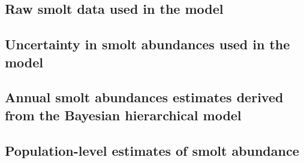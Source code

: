 \documentclass[12pt]{article}
\begin{document}
\clearpage



\clearpage



\clearpage



\clearpage

\subsection*{Raw smolt data used in the model}



\clearpage

\subsection*{Uncertainty in smolt abundances used in the model}



\clearpage

\subsection*{Annual smolt abundances estimates derived from the Bayesian hierarchical model}


\clearpage

\subsection*{Population-level estimates of smolt abundance}




\clearpage




\end{document}

